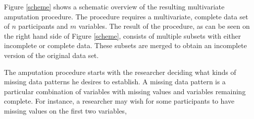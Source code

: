 \documentclass[11pt,a4paper]{article}
\begin{document}
Figure \ref{scheme} shows a schematic overview of the resulting  multivariate amputation procedure. The procedure requires a multivariate, complete data set of $n$ participants and $m$ variables. The result of the procedure, as can be seen on the right hand side of Figure \ref{scheme}, consists of multiple subsets with either incomplete or complete data. These subsets are merged to obtain an incomplete version of the original data set. 

The amputation procedure starts with the researcher deciding what kinds of missing data patterns he desires to establish. A missing data pattern is a particular combination of variables with missing values and variables remaining complete. For instance, a researcher may wish for some participants to have missing values on the first two variables, 
\end{document}
